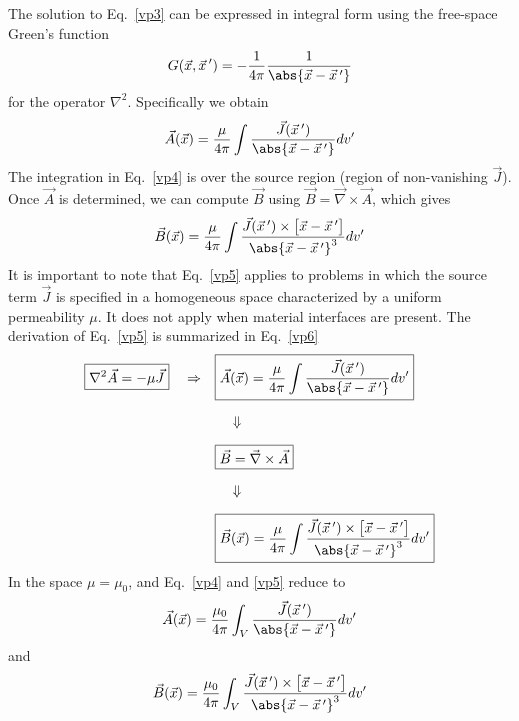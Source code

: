 \documentclass[12pt,a4paper,oneside]{book}
\begin{document}
\begin{onehalfspace}
\begin{equation*}
\end{equation*}
The solution to Eq.~\eqref{vp3} can be expressed in integral form using the free-space Green's function $$ G(\vec{x},\vec{x}\,')=-\frac{1}{4\pi}\frac{1}{\abs{\vec{x}-\vec{x}\,'}}$$  for the operator $\nabla^2$. Specifically we obtain  
\begin{equation}\label{vp4}
\vec{A}(\vec{x}) = \frac{\mu}{4\pi}\int\frac{\vec{J}(\vec{x}\,')}{\abs{\vec{x}-\vec{x}\,'}}dv'
\end{equation}
The integration in Eq.~\eqref{vp4} is over the source region (region of non-vanishing $\vec{J}$). Once $\vec{A}$ is determined, we can compute $\vec{B}$ using $\vec{B}=\vec{\nabla}\times\vec{A}$, which gives
\begin{equation}\label{vp5}
	\vec{B}(\vec{x}) = \frac{\mu}{4\pi}\int\frac{\vec{J}(\vec{x}\,')\times\big[\vec{x}-\vec{x}\,'\big]}{\abs{\vec{x}-\vec{x}\,'}^3}dv'
\end{equation}
It is important to note that Eq.~\eqref{vp5} applies to problems in which the source term $\vec{J}$ is specified in a homogeneous space characterized by a uniform permeability $\mu$. It does not apply when material interfaces are present. The derivation of Eq.~\eqref{vp5} is summarized in Eq.~\eqref{vp6}
\begin{equation}\label{vp6}
\begin{aligned}
	\boxed{\nabla^2\vec{A}=-\mu\vec{J}}\quad\Rightarrow\quad&
	\boxed{	\vec{A}(\vec{x}) = \frac{\mu}{4\pi}\int\frac{\vec{J}(\vec{x}\,')}{\abs{\vec{x}-\vec{x}\,'}}dv'} \\[6pt]
	&\quad\Downarrow \\[6pt]
	&\boxed{\vec{B}=\vec{\nabla}\times\vec{A}} \\[6pt]
	&\quad\Downarrow \\[6pt]
	&\boxed{\vec{B}(\vec{x}) = \frac{\mu}{4\pi}\int \frac{\vec{J}(\vec{x}\,')\times\big[\vec{x}-\vec{x}\,'\big]}{\abs{\vec{x}-\vec{x}\,'}^3}dv'}
\end{aligned}
\end{equation}
In the space $\mu=\mu_0$, and Eq.~\eqref{vp4} and \ref{vp5} reduce to 
\begin{equation}\label{vp7}
	\vec{A}(\vec{x}) = \frac{\mu_0}{4\pi}\int_{V}\frac{\vec{J}(\vec{x}\,')}{\abs{\vec{x}-\vec{x}\,'}}dv'
\end{equation}
and
\begin{equation}\label{vp8}
	\vec{B}(\vec{x}) = \frac{\mu_0}{4\pi}\int_{V}\frac{\vec{J}(\vec{x}\,')\times\big[\vec{x}-\vec{x}\,'\big]}{\abs{\vec{x}-\vec{x}\,'}^3}dv'
\end{equation}

\end{onehalfspace}
\end{document}
